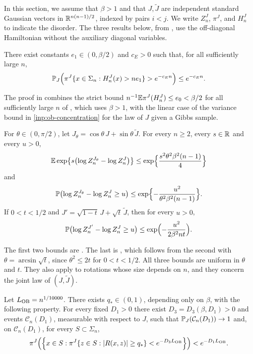 In this section, we assume that $\beta>1$ and that $J,\widetilde J$ are independent
standard Gaussian vectors in $\mathbb R^{n(n-1)/2}$, indexed by pairs $i<j$. We write $Z_n^J$, $\pi^J$, and $H_n^J$
to indicate the disorder. The three results below, from \cite[Sections~5--6]{oai-barriers},
use the off-diagonal Hamiltonian without the auxiliary diagonal variables.

\begin{proposition}\label{inp:ob-energy-tail}
There exist constants $e_1\in(0,\beta/2)$ and $c_E>0$ such that, for all
sufficiently large $n$,
\[
 \mathbb P_J\Bigl(\pi^J\{x\in\Sigma_n:H_n^J(x)>ne_1\}>e^{-c_En}\Bigr)\le e^{-c_En}.
\]
\end{proposition}

The proof in \cite{oai-barriers} combines the strict bound
$n^{-1}\mathbb E\pi^J(H_n^J)\le e_0<\beta/2$ for all sufficiently large $n$ of
\cite[Lemma~3.3]{oai-barriers}, which
uses $\beta>1$, with the linear case of the variance bound in
\cref{inp:ob-concentration} for the law of $J$ given a Gibbs sample.

\begin{proposition}\label{inp:ob-rotation}
For $\theta\in(0,\pi/2)$, let $J_\theta=\cos\theta\,J+\sin\theta\,\widetilde J$. For every
$n\ge2$, every $s\in\mathbb R$ and every $u>0$,
\[
 \mathbb E\exp\bigl\{s\bigl(\log Z_n^{J_\theta}-\log Z_n^J\bigr)\bigr\}
 \le\exp\Bigl\{\frac{s^2\theta^2\beta^2(n-1)}4\Bigr\}
\]
and
\[
 \mathbb P\bigl(\log Z_n^{J_\theta}-\log Z_n^J\ge u\bigr)
 \le\exp\Bigl\{-\frac{u^2}{\theta^2\beta^2(n-1)}\Bigr\}.
\]
If $0<t<1/2$ and $J'=\sqrt{1-t}\,J+\sqrt t\,\widetilde J$, then for every $u>0$,
\[
 \mathbb P\bigl(\log Z_n^{J'}-\log Z_n^J\ge u\bigr)\le\exp\Bigl(-\frac{u^2}{2\beta^2nt}\Bigr).
\]
\end{proposition}

The first two bounds are \cite[(5.3)--(5.4)]{oai-barriers}. The last is
\cite[(5.5)]{oai-barriers}, which follows from the second with
$\theta=\arcsin\sqrt t$, since $\theta^2\le2t$ for $0<t<1/2$. All three bounds
are uniform in $\theta$ and $t$. They also apply to rotations whose
size depends on $n$, and they concern the joint law of $(J,\widetilde J)$.

\begin{proposition}\label{inp:ob-coverage}
Let $L_{\rm OB}=n^{1/10000}$. There exists $q_*\in(0,1)$, depending only on
$\beta$, with the following property. For every fixed $D_1>0$ there exist
$D_3=D_3(\beta,D_1)>0$ and events $\mathcal C_n(D_1)$, measurable with respect to
$J$, such that $\mathbb P_J(\mathcal C_n(D_1))\to1$ and, on $\mathcal C_n(D_1)$, for
every $S\subset\Sigma_n$,
\[
 \pi^J\Bigl(\Bigl\{x\in S:\pi^J\{z\in S:\lvert R(x,z)\rvert\ge q_*\}<e^{-D_3L_{\rm OB}}\Bigr\}\Bigr)
 <e^{-D_1L_{\rm OB}}.
\]
\end{proposition}

